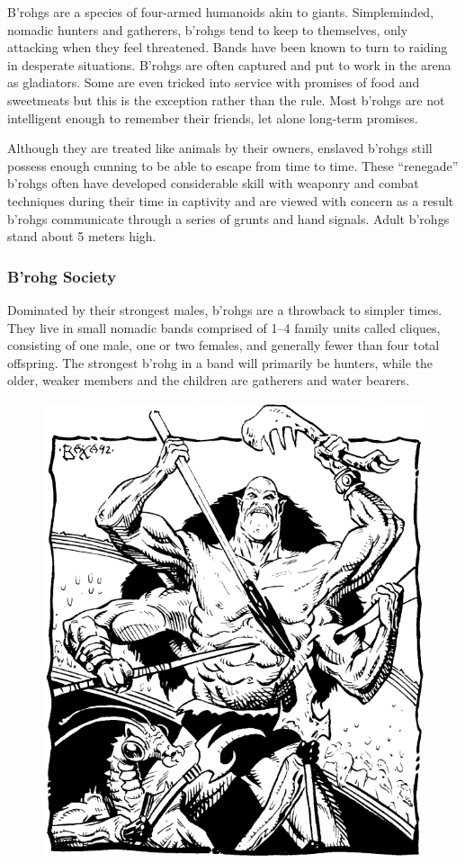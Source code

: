B'rohgs are a species of four-armed humanoids akin to giants. Simpleminded, nomadic hunters and gatherers, b'rohgs tend to keep to themselves, only attacking when they feel threatened. Bands have been known to turn to raiding in desperate situations. B'rohgs are often captured and put to work in the arena as gladiators. Some are even tricked into service with promises of food and sweetmeats but this is the exception rather than the rule. Most b'rohgs are not intelligent enough to remember their friends, let alone long-term promises.

Although they are treated like animals by their owners, enslaved b'rohgs still possess enough cunning to be able to escape from time to time. These ``renegade'' b'rohgs often have developed considerable skill with weaponry and combat techniques during their time in captivity and are viewed with concern as a result b'rohgs communicate through a series of grunts and hand signals. Adult b'rohgs stand about 5 meters high.

\subsubsection{B'rohg Society}
Dominated by their strongest males, b'rohgs are a throwback to simpler times. They live in small nomadic bands comprised of 1--4 family units called cliques, consisting of one male, one or two females, and generally fewer than four total offspring. The strongest b'rohg in a band will primarily be hunters, while the older, weaker members and the children are gatherers and water bearers.
\begin{figure}[t!]
\centering
\includegraphics[width=\columnwidth]{images/b-rohg-2.png}
\WOTC
\end{figure}

